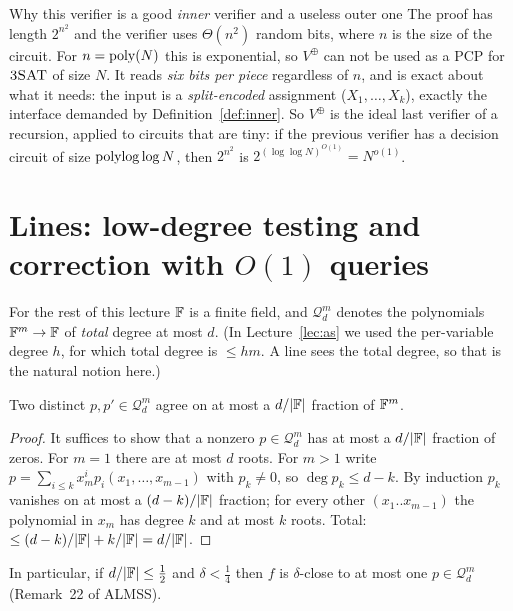\begin{bigpicture}{Why this verifier is a good \emph{inner} verifier and a useless outer one}
The proof has length $2^{n^2}$ and the verifier uses $\Theta(n^2)$ random bits, where $n$ is the size of the circuit.  For $n=\operatorname{poly}(N)$ this is exponential, so $V^\oplus$ can not be used as a PCP for $\textsc{3SAT}$ of size $N$.
It reads \emph{six bits per piece} regardless of $n$, and is exact about what it needs: the input is a \emph{split-encoded} assignment ($X_1,\dots,X_k$), exactly the interface demanded by Definition~\ref{def:inner}.
So $V^\oplus$ is the ideal last verifier of a recursion, applied to circuits that are tiny: if the previous verifier has a decision circuit of size $\operatorname{polylog}\log N$, then $2^{n^2}$ is $2^{(\log\log N)^{O(1)}}=N^{o(1)}$.
\end{bigpicture}


\section{\texorpdfstring{Lines: low-degree testing and correction with $O(1)$ queries}{Lines: low-degree testing and correction with O(1) queries}}
\label{sec:lines}

For the rest of this lecture $\mathbb{F}$ is a finite field, and $\mathcal Q^m_d$ denotes the polynomials $\mathbb{F}^m\to\mathbb{F}$ of \emph{total} degree at most $d$.
(In Lecture~\ref{lec:as} we used the per-variable degree $h$, for which total degree is $\le hm$.  A line sees the total degree, so that is the natural notion here.)

\begin{lemma}\label{lem:sz-tot}
Two distinct $p,p'\in\mathcal Q^m_d$ agree on at most a $d/|\mathbb{F}|$ fraction of $\mathbb{F}^m$.
\end{lemma}
\begin{proof}
It suffices to show that a nonzero $p\in\mathcal Q^m_d$ has at most a $d/|\mathbb{F}|$ fraction of zeros.  For $m=1$ there are at most $d$ roots.  For $m>1$ write $p=\sum_{i\le k}x_m^ip_i(x_1,\dots,x_{m-1})$ with $p_k\ne0$, so $\deg p_k\le d-k$.
By induction $p_k$ vanishes on at most a $(d-k)/|\mathbb{F}|$ fraction; for every other $(x_1..x_{m-1})$ the polynomial in $x_m$ has degree $k$ and at most $k$ roots.  Total: $\le(d-k)/|\mathbb{F}|+k/|\mathbb{F}|=d/|\mathbb{F}|$.
\end{proof}

\noindent
In particular, if $d/|\mathbb{F}|\le\tfrac12$ and $\delta<\tfrac14$ then $f$ is $\delta$-close to at most one $p\in\mathcal Q^m_d$ (Remark~22 of ALMSS).

